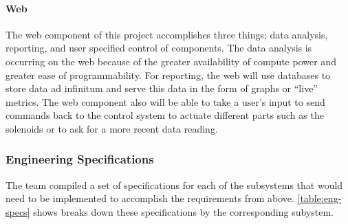 \paragraph{Web}
The web component of this project accomplishes three things; data analysis, reporting, and user specified control of components. The data analysis is occurring on the web because of the greater availability of compute power and greater ease of programmability. For reporting, the web will use databases to store data ad infinitum and serve this data in the form of graphs or ``live'' metrics. The web component also will be able to take a user's input to send commands back to the control system to actuate different parts such as the solenoids or to ask for a more recent data reading.
\subsubsection{Engineering Specifications}
The team compiled a set of specifications for each of the subsystems that would need to be implemented to accomplish the requirements from above. \autoref{table:eng-specs} shows breaks down these specifications by the corresponding subystem.
